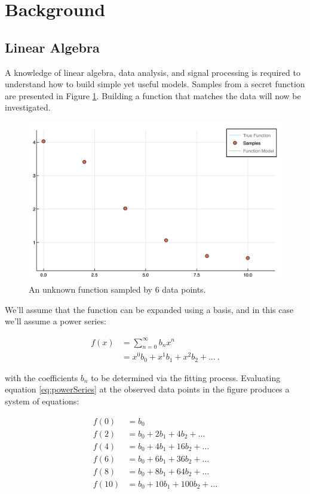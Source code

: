 \section{Background}\label{Sect:background}
\subsection{Linear Algebra}\label{Sect:linearAlgebra}
A knowledge of linear algebra, data analysis, and signal processing is required to understand how to build simple yet useful models. Samples from a secret function are presented in Figure \ref{fig:func1Samples}. Building a function that matches the data will now be investigated.

\begin{figure}[h]
\includegraphics[scale = 0.4]{Figures/func1Samples}
\caption{An unknown function sampled by 6 data points.
\label{fig:func1Samples}} 
\end{figure}

\par We'll assume that the function can be expanded using a basis, and in this case we'll assume a power series:

\begin{align}
f(x) &= \sum_{n=0}^\infty b_n x^n
	\label{eq:powerSum}\\ 
&= x^0b_0 + x^1b_1 + x^2b_2 + \ldots\ .
	\label{eq:powerSeries}
\end{align}

with the coefficients $b_n$ to be determined via the fitting process.  Evaluating equation \ref{eq:powerSeries} at the observed data points in the figure produces a system of equations:

\begin{align}
f(0) &= b_0\\
f(2) &= b_0 + 2 b_1 + 4 b_2 + \dots\\
f(4) &= b_0 + 4 b_1 + 16 b_2 + \dots\\
f(6) &= b_0 + 6 b_1 + 36 b_2 + \dots\\
f(8) &= b_0 + 8 b_1 + 64 b_2 + \dots\\
f(10) &= b_0 + 10 b_1 + 100 b_2 + \dots\\
\end{align}


